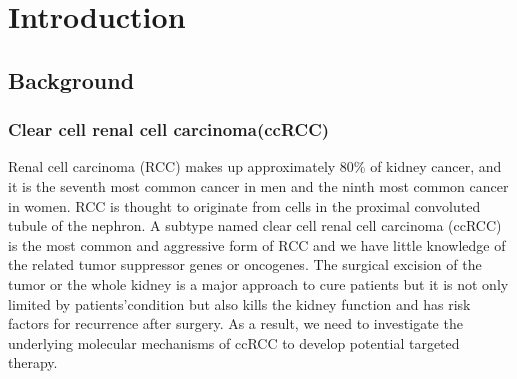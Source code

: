 \chapter{Introduction}

\section{Background}
\label{sec:background}

\subsection{Clear cell renal cell carcinoma(ccRCC)}
\label{subsec:Clear}

Renal cell carcinoma (RCC) makes up approximately 80\% of kidney cancer, and it is the seventh most common cancer in men and the ninth most common cancer in women\cite{rini_renal_2009}. RCC is thought to originate from cells in the proximal convoluted tubule of the nephron. A subtype named clear cell renal cell carcinoma (ccRCC) is the most common and aggressive form of RCC and we have little knowledge of the related tumor suppressor genes or oncogenes\cite{yang_gene_2017}. The surgical excision of the tumor or the whole kidney is a major approach to cure patients but it is not only limited by patients’condition but also kills the kidney function and has risk factors for recurrence after surgery. As a result, we need to investigate the underlying molecular mechanisms of ccRCC to develop potential targeted therapy.


